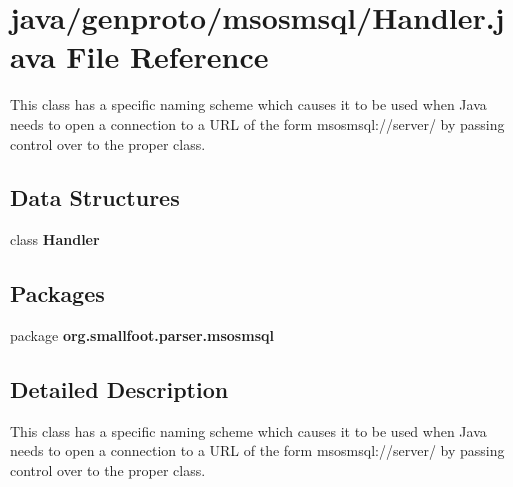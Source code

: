 \section{java/genproto/msosmsql/\+Handler.java File Reference}
\label{msosmsql_2Handler_8java}


This class has a specific naming scheme which causes it to be used when Java needs to open a connection to a U\+R\+L of the form msosmsql\+://server/ by passing control over to the proper class.  


\subsection*{Data Structures}
\begin{DoxyCompactItemize}
\item 
class {\bf Handler}
\end{DoxyCompactItemize}
\subsection*{Packages}
\begin{DoxyCompactItemize}
\item 
package {\bf org.\+smallfoot.\+parser.\+msosmsql}
\end{DoxyCompactItemize}


\subsection{Detailed Description}
This class has a specific naming scheme which causes it to be used when Java needs to open a connection to a U\+R\+L of the form msosmsql\+://server/ by passing control over to the proper class. 


